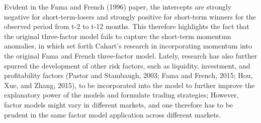 \documentclass[12pt]{article}
\begin{document}
	\noindent Evident in the Fama and French (1996) paper, the intercepts are strongly negative for short-term-losers and strongly positive for short-term winners for the observed period from t-2 to t-12 months. This therefore highlights the fact that the original three-factor model fails to capture the short-term momentum anomalies, in which set forth Cahart’s research in incorporating momentum into the original Fama and French three-factor model. Lately, research has also further spurred the development of other risk factors, such as liquidity, investment, and profitability factors (Pastor and Stambaugh,
	2003; Fama and French, 2015; Hou, Xue, and Zhang, 2015), to be incorporated into the model to further improve the explanatory power of the models and formulate trading strategies; However, factor models might vary in different markets, and one therefore has to be prudent in the same factor model application across different markets. \\
\end{document}

